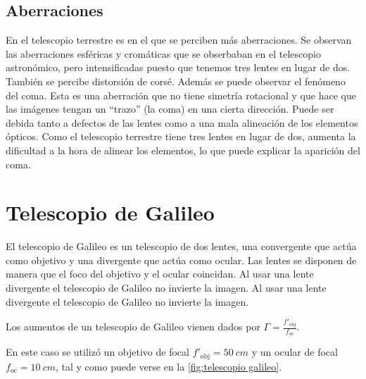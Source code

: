 \documentclass[12pt]{article}
\numberwithin{table}{section}
\numberwithin{figure}{section}
\numberwithin{equation}{section}
\begin{document}
\subsection{Aberraciones}
En el telescopio terrestre es en el que se perciben más aberraciones. Se observan las aberraciones esféricas y cromáticas que se obserbaban en el telescopio astronómico, pero intensificadas puesto que tenemos tres lentes en lugar de dos. También se percibe distorsión de corsé. Además se puede observar el fenómeno del coma. Esta es una aberración que no tiene simetría rotacional y que hace que las imágenes tengan un ``trazo'' (la coma) en una cierta dirección. Puede ser debida tanto a defectos de las lentes como a una mala alineación de los elementos ópticos. Como el telescopio terrestre tiene tres lentes en lugar de dos, aumenta la dificultad a la hora de alinear los elementos, lo que puede explicar la aparición del coma. 

\section{Telescopio de Galileo}
El telescopio de Galileo es un telescopio de dos lentes, una convergente que actúa como objetivo y una divergente que actúa como ocular. Las lentes se disponen de manera que el foco del objetivo y el ocular coincidan. Al usar una lente divergente el telescopio de Galileo no invierte la imagen. Al usar una lente divergente el telescopio de Galileo no invierte la imagen.

Los aumentos de un telescopio de Galileo vienen dados por \( \Gamma = \frac{f'_\text{obj}}{f_\text{oc}} \).

En este caso se utilizó un objetivo de focal \( f'_\text{obj} = \SI{50}{cm} \) y un ocular de focal \( f_\text{oc} = \SI{10}{cm} \), tal y como puede verse en la \cref{fig:telescopio galileo}.
\end{document}
